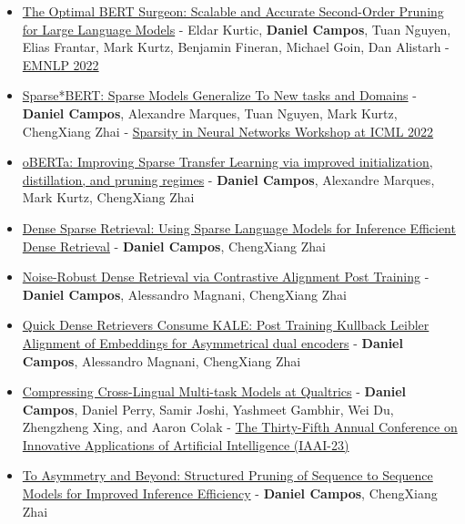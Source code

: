 \begin{itemize}
\item \href{https://arxiv.org/abs/2203.07259}{The Optimal BERT Surgeon: Scalable and Accurate Second-Order Pruning for Large Language Models} - Eldar Kurtic, \textbf{Daniel Campos}, Tuan Nguyen, Elias Frantar, Mark Kurtz, Benjamin Fineran, Michael Goin, Dan Alistarh - \href{https://2022.emnlp.org/}{EMNLP 2022}
\item \href{https://arxiv.org/abs/2205.12452}{Sparse*BERT: Sparse Models Generalize To New tasks and Domains} - \textbf{Daniel Campos}, Alexandre Marques, Tuan Nguyen, Mark Kurtz, ChengXiang Zhai - \href{https://www.sparseneural.net/}{Sparsity in Neural Networks Workshop at ICML 2022}
\item \href{https://arxiv.org/abs/2303.17612}{oBERTa: Improving Sparse Transfer Learning via improved initialization, distillation, and pruning regimes} - \textbf{Daniel Campos}, Alexandre Marques, Mark Kurtz, ChengXiang Zhai 
\item \href{https://arxiv.org/abs/2304.00114}{Dense Sparse Retrieval: Using Sparse Language Models for Inference Efficient Dense Retrieval} - \textbf{Daniel Campos}, ChengXiang Zhai
\item \href{https://arxiv.org/abs/2304.03401}{Noise-Robust Dense Retrieval via Contrastive Alignment Post Training} - \textbf{Daniel Campos}, Alessandro Magnani, ChengXiang Zhai
\item \href{https://arxiv.org/abs/2304.01016}{Quick Dense Retrievers Consume KALE: Post Training Kullback Leibler Alignment of Embeddings for Asymmetrical dual encoders} - \textbf{Daniel Campos}, Alessandro Magnani, ChengXiang Zhai
\item \href{https://arxiv.org/abs/2211.15927}{Compressing Cross-Lingual Multi-task Models at Qualtrics} - \textbf{Daniel Campos}, Daniel Perry, Samir Joshi, Yashmeet Gambhir, Wei Du, Zhengzheng Xing, and Aaron Colak - \href{https://aaai.org/Conferences/AAAI-23/iaai-23-call/}{The Thirty-Fifth Annual Conference on Innovative Applications of Artificial Intelligence (IAAI-23)}
\item \href{https://arxiv.org/abs/2304.02721}{To Asymmetry and Beyond: Structured Pruning of Sequence to Sequence Models for Improved Inference Efficiency} - \textbf{Daniel Campos}, ChengXiang Zhai
\end{itemize}